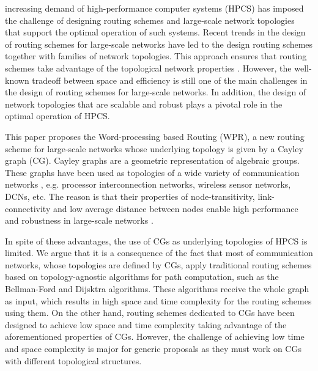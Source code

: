 \label{sec:1-introduction}

 increasing demand of high-performance computer systems (HPCS) has imposed the challenge of designing routing schemes and large-scale network topologies that support the optimal operation of such systems. Recent trends in the design of routing schemes for large-scale networks have led to the design routing schemes together with families of network topologies. This approach ensures that routing schemes take advantage of the topological network properties \cite{bcube,dcell,fat_tree,ethernet,opticalDCN}. However, the well-known tradeoff between space and efficiency is still one of the main challenges in the design of routing schemes for large-scale networks. In addition, the design of network topologies that are scalable and robust plays a pivotal role in the optimal operation of HPCS. 

This paper proposes the Word-processing based Routing (WPR), a new routing scheme for large-scale networks whose underlying topology is given by a Cayley graph (CG). Cayley graphs are a geometric representation of algebraic groups. These graphs have been used as topologies of a wide variety of communication networks \cite{arcCG,sw_cg,hierCG}, e.g. processor interconnection networks, wireless sensor networks, DCNs, etc. The reason is that their properties of node-transitivity, link-connectivity and low average distance between nodes enable high performance and robustness in large-scale networks  \cite{cits_Aguirre}. 


In spite of these advantages, the use of CGs as underlying topologies of HPCS is limited. We argue that it is a consequence of the fact that most of communication networks, whose topologies are defined by CGs, apply traditional routing schemes based on topology-agnostic algorithms for path computation, such as the Bellman-Ford and Dijsktra algorithms. These algorithms receive the whole graph as input, which results in high space and time complexity for the routing schemes using them. 
On the other hand, routing schemes dedicated to CGs have been designed to achieve low space and time complexity taking advantage of the aforementioned properties of CGs. However, the challenge of achieving low time and space complexity is major for generic proposals as they must work on CGs with different topological structures. 


